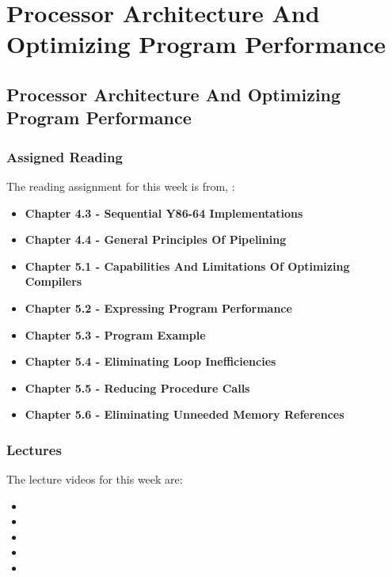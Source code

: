 \clearpage

\renewcommand{\ChapTitle}{Processor Architecture And Optimizing Program Performance}
\renewcommand{\SectionTitle}{Processor Architecture And Optimizing Program Performance}

\chapter{\ChapTitle}
\section{\SectionTitle}

\subsection{Assigned Reading}

The reading assignment for this week is from, \Textbook:

\begin{itemize}
    \item \textbf{Chapter 4.3 - Sequential Y86-64 Implementations}
    \item \textbf{Chapter 4.4 - General Principles Of Pipelining}
    \item \textbf{Chapter 5.1 - Capabilities And Limitations Of Optimizing Compilers}
    \item \textbf{Chapter 5.2 - Expressing Program Performance}
    \item \textbf{Chapter 5.3 - Program Example}
    \item \textbf{Chapter 5.4 - Eliminating Loop Inefficiencies}
    \item \textbf{Chapter 5.5 - Reducing Procedure Calls}
    \item \textbf{Chapter 5.6 - Eliminating Unneeded Memory References}
\end{itemize}

\subsection{Lectures}

The lecture videos for this week are:

\begin{itemize}
    \item {}
    \item {}
    \item {}
    \item {}
    \item {}
\end{itemize}

